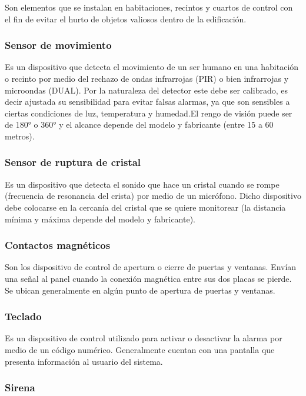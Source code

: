 Son elementos que se instalan en habitaciones, recintos y cuartos de control con el fin de evitar el hurto de objetos valiosos dentro de la edificación.

\subsubsection{Sensor de movimiento}

Es un dispositivo que detecta el movimiento de un ser humano en una habitación o recinto por medio del rechazo de ondas infrarrojas (PIR) o bien infrarrojas y microondas (DUAL). Por la naturaleza del detector este debe ser calibrado, es decir ajustada su sensibilidad para evitar falsas alarmas, ya que son sensibles a ciertas condiciones de luz, temperatura y humedad.El rengo de visión puede ser de 180° o 360° y el alcance depende del modelo y  fabricante (entre 15 a 60 metros). \cite{Movimiento}

\subsubsection{Sensor de ruptura de cristal}

Es un dispositivo que detecta el sonido que hace un cristal cuando se rompe (frecuencia de resonancia del crista) por medio de un micrófono. Dicho dispositivo debe colocarse en la cercanía del cristal que se quiere monitorear (la distancia mínima y máxima depende del modelo y fabricante). \cite{Cristal}  

\subsubsection{Contactos magnéticos}

Son los dispositivo de control de apertura o cierre de puertas y ventanas. Envían una señal al panel cuando la conexión magnética entre sus dos placas se pierde. Se ubican generalmente en algún punto de apertura de puertas y ventanas. \cite{CIEMI}

\subsubsection{Teclado}

Es un dispositivo de control utilizado para activar o desactivar la alarma por medio de un código numérico. Generalmente cuentan con una pantalla que presenta información al usuario del sistema. \cite{Teclado}


\subsubsection{Sirena}

